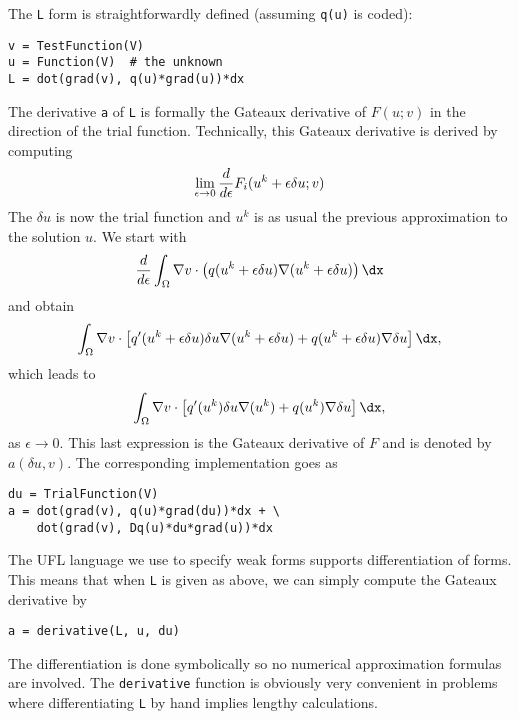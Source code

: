 The {\fontsize{12pt}{12pt}\texttt{L}} form is straightforwardly defined (assuming {\fontsize{12pt}{12pt}\texttt{q(u)}} is
coded):
\begin{Verbatim}[fontsize=\fontsize{10pt}{10pt},tabsize=8,baselinestretch=1.05,
fontfamily=tt,xleftmargin=7mm]
v = TestFunction(V)
u = Function(V)  # the unknown
L = dot(grad(v), q(u)*grad(u))*dx
\end{Verbatim}
\noindent

The derivative {\fontsize{12pt}{12pt}\texttt{a}} of {\fontsize{12pt}{12pt}\texttt{L}} is formally the 
Gateaux derivative of $F(u;v)$ in the direction of the trial function.
Technically, this Gateaux derivative is derived by computing
\begin{equation}
\lim_{\epsilon\rightarrow 0}{d\over d\epsilon} F_i(u^k + \epsilon\delta u; v)
\label{langtangen:poisson:nonlinear:Gateaux1}
\end{equation}
The $\delta u$ is now the trial function and $u^k$ is as usual the previous
approximation to the solution $u$.
We start with
\[ 
{d\over d\epsilon}\int_\Omega \nabla v\cdot\left( q(u^k + \epsilon\delta u)
\nabla (u^k + \epsilon\delta u)\right)\dx
\]
and obtain
\[
\int_\Omega \nabla v\cdot\left\lbrack
q'(u^k + \epsilon\delta u)\delta u
\nabla (u^k + \epsilon\delta u)
+
q(u^k + \epsilon\delta u)
\nabla \delta u
\right\rbrack\dx,
\]
which leads to
\begin{equation}
\int_\Omega \nabla v\cdot\left\lbrack
q'(u^k)\delta u
\nabla (u^k)
+
q(u^k)
\nabla \delta u
\right\rbrack\dx,
\end{equation}
as $\epsilon\rightarrow 0$.
This last expression is the Gateaux derivative of $F$ and is denoted
by $a(\delta u, v)$.
The corresponding implementation goes as
\begin{Verbatim}[fontsize=\fontsize{10pt}{10pt},tabsize=8,baselinestretch=1.05,
fontfamily=tt,xleftmargin=7mm]
du = TrialFunction(V)
a = dot(grad(v), q(u)*grad(du))*dx + \
    dot(grad(v), Dq(u)*du*grad(u))*dx
\end{Verbatim}
\noindent

The UFL language we use to specify weak forms supports differentiation
of forms. This means that when {\fontsize{12pt}{12pt}\texttt{L}} is given as above, we can simply
compute the Gateaux derivative by
\begin{Verbatim}[fontsize=\fontsize{10pt}{10pt},tabsize=8,baselinestretch=1.05,
fontfamily=tt,xleftmargin=7mm]
a = derivative(L, u, du)
\end{Verbatim}
\noindent
The differentiation is done symbolically so no numerical approximation
formulas are involved. The {\fontsize{12pt}{12pt}\texttt{derivative}} function is obviously
very convenient in problems where differentiating {\fontsize{12pt}{12pt}\texttt{L}} by hand
implies lengthy calculations.

